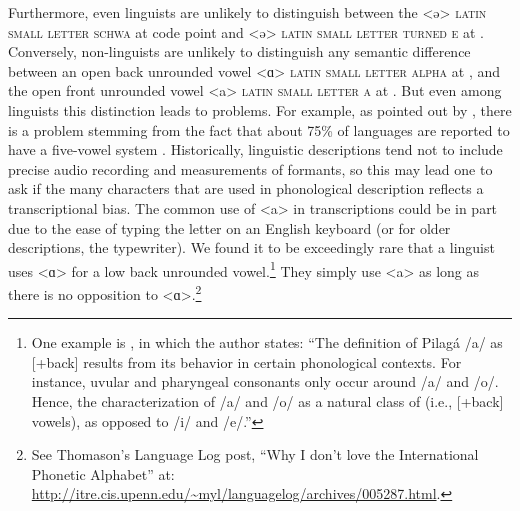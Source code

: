 Furthermore, even linguists are unlikely to distinguish between
the <ə> \textsc{latin small letter schwa} at code point  and <ǝ>
\textsc{latin small letter turned e} at . Conversely,
non-linguists are unlikely to distinguish any semantic difference between an
open back unrounded vowel <ɑ> \textsc{latin small letter alpha} at
, and the open front unrounded vowel <a> \textsc{latin small letter
a} at . But even among linguists this distinction leads to problems.
For example, as pointed out by \citet{Mielke2009}, there is a problem stemming
from the fact that about 75\% of languages are reported to have a five-vowel
system \citep{Maddieson1984}. Historically, linguistic descriptions tend not to
include precise audio recording and measurements of formants, so this may lead
one to ask if the many characters that are used in phonological description
reflects a transcriptional bias. The common use of <a> in transcriptions
could be in part due to the ease of typing the letter on an English keyboard (or
for older descriptions, the typewriter). We found it to be exceedingly rare that
a linguist uses <ɑ> for a low back unrounded vowel.\footnote{One example is
\citet[75]{Vidal2001a}, in which the author states: ``The definition of Pilagá
/a/ as {[}+back{]} results from its behavior in certain phonological contexts.
For instance, uvular and pharyngeal consonants only occur around /a/ and /o/.
Hence, the characterization of /a/ and /o/ as a natural class of (i.e.,
{[}+back{]} vowels), as opposed to /i/ and /e/.''} They simply use <a> as
long as there is no opposition to <ɑ>.\footnote{See Thomason's Language Log
post, ``Why I don't love the International Phonetic Alphabet'' at:
\url{http://itre.cis.upenn.edu/~myl/languagelog/archives/005287.html}.}

